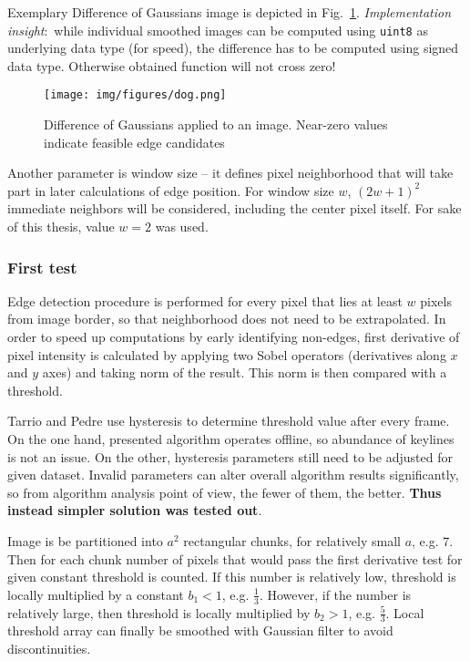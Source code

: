 Exemplary Difference of Gaussians image is depicted in Fig.~\ref{fig:dog}. \textit{Implementation insight}:~while individual smoothed images can be computed using {\tt uint8} as underlying data type (for speed), the difference has to be computed using signed data type. Otherwise obtained function will not cross zero!

\begin{figure}[ht]
	\centering\texttt{[image: img/figures/dog.png]}
	\caption{ Difference of Gaussians applied to an image. Near-zero values indicate feasible edge candidates }
	\label{fig:dog}
\end{figure}

Another parameter is window size -- it defines pixel neighborhood that will take part in later calculations of edge position. For window size $w$, $(2w+1)^2$ immediate neighbors will be considered, including the center pixel itself. For sake of this thesis, value $w = 2$ was used.

\subsubsection{First test}
\label{edge_first}

Edge detection procedure is performed for every pixel that lies at least $w$ pixels from image border, so that neighborhood does not need to be extrapolated. In order to speed up computations by early identifying non-edges, first derivative of pixel intensity is calculated by applying two Sobel operators (derivatives along $x$ and $y$ axes) and taking norm of the result. This norm is then compared with a threshold. 

Tarrio and Pedre use hysteresis to determine threshold value after every frame. On the one hand, presented algorithm operates offline, so abundance of keylines is not an issue. On the other, hysteresis parameters still need to be adjusted for given dataset. Invalid parameters can alter overall algorithm results significantly, so from algorithm analysis point of view, the fewer of them, the better. \textbf{Thus instead simpler solution was tested out}.

Image is be partitioned into $a^2$ rectangular chunks, for relatively small $a$, e.g. 7. Then for each chunk number of pixels that would pass the first derivative test for given constant threshold is counted. If this number is relatively low, threshold is locally multiplied by a constant ${b_{1} < 1}$, e.g. $\frac{1}{3}$. However, if the number is relatively large, then threshold is locally multiplied by ${b_{2} > 1}$, e.g. $\frac{5}{3}$. Local threshold array can finally be smoothed with Gaussian filter to avoid discontinuities.

